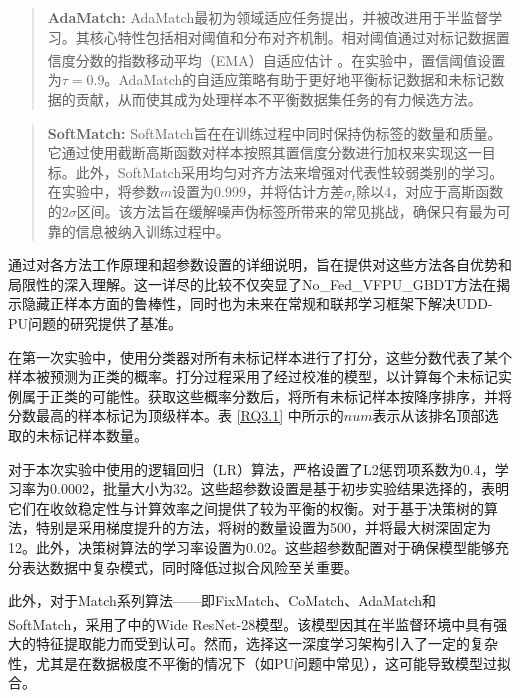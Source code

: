 \begin{quote}
	\textbf{AdaMatch:} AdaMatch最初为领域适应任务提出，并被改进用于半监督学习。其核心特性包括相对阈值和分布对齐机制。相对阈值通过对标记数据置信度分数的指数移动平均（EMA）自适应估计 \textsuperscript{\cite{tarvainen2017mean}}。在实验中，置信阈值设置为$\tau = 0.9$。AdaMatch的自适应策略有助于更好地平衡标记数据和未标记数据的贡献，从而使其成为处理样本不平衡数据集任务的有力候选方法。
\end{quote}

\begin{quote}
	\textbf{SoftMatch:} SoftMatch旨在在训练过程中同时保持伪标签的数量和质量。它通过使用截断高斯函数对样本按照其置信度分数进行加权来实现这一目标。此外，SoftMatch采用均匀对齐方法来增强对代表性较弱类别的学习。在实验中，将参数$m$设置为0.999，并将估计方差${{\hat \sigma }_t}$除以4，对应于高斯函数的$2\sigma$区间。该方法旨在缓解噪声伪标签所带来的常见挑战，确保只有最为可靠的信息被纳入训练过程中。
\end{quote}


通过对各方法工作原理和超参数设置的详细说明，旨在提供对这些方法各自优势和局限性的深入理解。这一详尽的比较不仅突显了No\_Fed\_VFPU\_GBDT方法在揭示隐藏正样本方面的鲁棒性，同时也为未来在常规和联邦学习框架下解决UDD-PU问题的研究提供了基准。


在第一次实验中，使用分类器对所有未标记样本进行了打分，这些分数代表了某个样本被预测为正类的概率。打分过程采用了经过校准的模型，以计算每个未标记实例属于正类的可能性。获取这些概率分数后，将所有未标记样本按降序排序，并将分数最高的样本标记为顶级样本。表 \ref{RQ3.1} 中所示的$ num $表示从该排名顶部选取的未标记样本数量。

对于本次实验中使用的逻辑回归（LR）算法，严格设置了L2惩罚项系数为0.4，学习率为0.0002，批量大小为32。这些超参数设置是基于初步实验结果选择的，表明它们在收敛稳定性与计算效率之间提供了较为平衡的权衡。对于基于决策树的算法，特别是采用梯度提升的方法，将树的数量设置为500，并将最大树深固定为12。此外，决策树算法的学习率设置为0.02。这些超参数配置对于确保模型能够充分表达数据中复杂模式，同时降低过拟合风险至关重要。

此外，对于Match系列算法——即FixMatch、CoMatch、AdaMatch和SoftMatch，采用了\textsuperscript{\cite{oliver2018realistic}}中的Wide ResNet-28模型。该模型因其在半监督环境中具有强大的特征提取能力而受到认可。然而，选择这一深度学习架构引入了一定的复杂性，尤其是在数据极度不平衡的情况下（如PU问题中常见），这可能导致模型过拟合。

